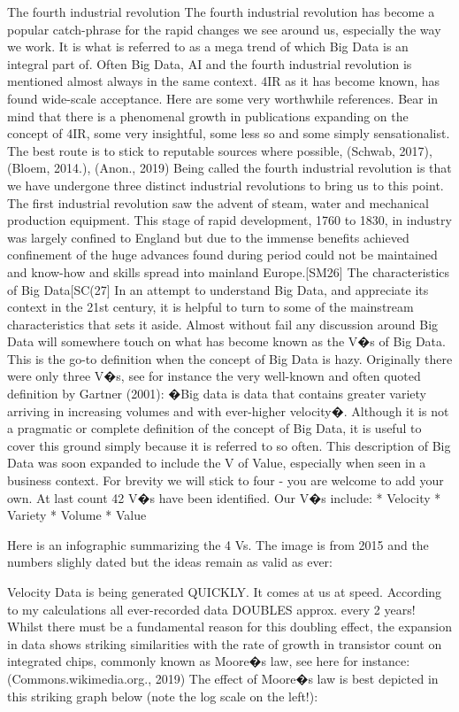 The fourth industrial revolution
The fourth industrial revolution has become a popular catch-phrase for the rapid changes we see around us, especially the way we work.  It is what is referred to as a mega trend of which Big Data is an integral part of.  Often Big Data, AI and the fourth industrial revolution is mentioned almost always in the same context.  4IR as it has become known, has found wide-scale acceptance.   Here are some very worthwhile references.  Bear in mind that there is a phenomenal growth in publications expanding on the concept of 4IR, some very insightful, some less so and some simply sensationalist.  The best route is to stick to reputable sources where possible, (Schwab, 2017), (Bloem, 2014.), (Anon., 2019)
Being called the fourth industrial revolution is that we have undergone three distinct industrial revolutions to bring us to this point. 
The first industrial revolution saw the advent of steam, water and mechanical production equipment.  This stage of rapid development, 1760 to 1830, in industry was largely confined to England but due to the immense benefits achieved confinement of the huge advances found during period could not be maintained and know-how and skills spread into mainland Europe.[SM26]
The characteristics of Big Data[SC(27]
In an attempt to understand Big Data, and appreciate its context in the 21st century, it is helpful to turn to some of the mainstream characteristics that sets it aside.  Almost without fail any discussion around Big Data will somewhere touch on what has become known as the V�s of Big Data.  This is the go-to definition when the concept of Big Data is hazy.  Originally there were only three V�s, see for instance the very well-known and often quoted definition by Gartner (2001): �Big data is data that contains greater variety arriving in increasing volumes and with ever-higher velocity�. 
Although it is not a pragmatic or complete definition of the concept of Big Data, it is useful to cover this ground simply because it is referred to so often.
This description of Big Data was soon expanded to include the V of Value, especially when seen in a business context.  
For brevity we will stick to four - you are welcome to add your own.  At last count 42 V�s have been identified.  Our V�s include:
* Velocity
* Variety
* Volume
* Value

Here is an infographic summarizing the 4 Vs.  The image is from 2015 and the numbers slighly dated but the ideas remain as valid as ever:

 

Velocity
Data is being generated QUICKLY.  It comes at us at speed.  According to my calculations all ever-recorded data DOUBLES approx. every 2 years!  Whilst there must be a fundamental reason for this doubling effect, the expansion in data shows striking similarities with the rate of growth in transistor count on integrated chips, commonly known as Moore�s law, see here for instance:
(Commons.wikimedia.org., 2019)
The effect of Moore�s law is best depicted in this striking graph below (note the log scale on the left!): 




